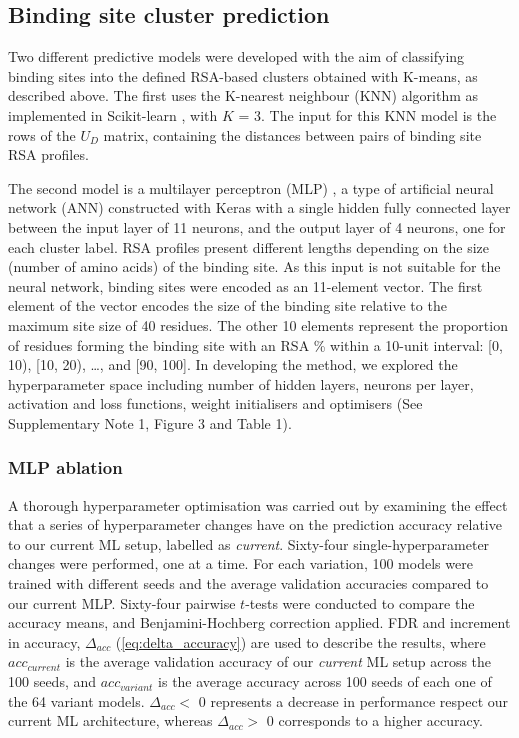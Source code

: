 \subsection{Binding site cluster prediction}

Two different predictive models were developed with the aim of classifying binding sites into the defined RSA-based clusters obtained with K-means, as described above. The first  uses the K-nearest neighbour (KNN) algorithm as implemented in Scikit-learn \cite{PEDREGOSA_2011_SKLEARN}, with $K$ = 3. The input for this KNN model is the rows of the $U_{D}$ matrix, containing the distances between pairs of binding site RSA profiles.

The second model is a multilayer perceptron (MLP) \cite{CYBENKO_1989_MLP}, a type of artificial neural network (ANN) constructed with Keras \cite{CHOLLET_2015_KERAS} with a single hidden fully connected layer between the input layer of 11 neurons, and the output layer of 4 neurons, one for each cluster label. RSA profiles present different lengths depending on the size (number of amino acids) of the binding site. As this input is not suitable for the neural network, binding sites were encoded as an 11-element vector. The first element of the vector encodes the size of the binding site relative to the maximum site size of 40 residues. The other 10 elements represent the proportion of residues forming the binding site with an RSA \% within a 10-unit interval: [0, 10), [10, 20), …, and [90, 100]. In developing the method, we explored the hyperparameter space including number of hidden layers, neurons per layer, activation and loss functions, weight initialisers and optimisers (See Supplementary Note 1, Figure 3 and Table 1).

\subsubsection{MLP ablation}

A thorough hyperparameter optimisation was carried out by examining the effect that a series of hyperparameter changes have on the prediction accuracy relative to our current ML setup, labelled as \textit{current}. Sixty-four single-hyperparameter changes were performed, one at a time. For each variation, 100 models were trained with different seeds and the average validation accuracies compared to our current MLP. Sixty-four pairwise $t$-tests were conducted to compare the accuracy means, and Benjamini-Hochberg correction \cite{BENJAMINI_1995_FDR} applied. FDR and increment in accuracy, $\Delta_{acc}$ (\autoref{eq:delta_accuracy}) are used to describe the results, where $acc_{current}$ is the average validation accuracy of our \textit{current} ML setup across the 100 seeds, and $acc_{variant}$ is the average accuracy across 100 seeds of each one of the 64 variant models. $\Delta_{acc} <$ 0 represents a decrease in performance respect our current ML architecture, whereas $\Delta_{acc} >$ 0 corresponds to a higher accuracy.

